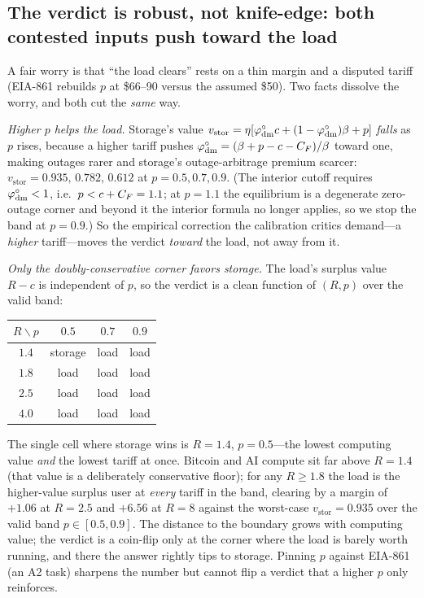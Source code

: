 \subsection*{The verdict is robust, not knife-edge: both contested inputs push toward the load}
A fair worry is that ``the load clears'' rests on a thin margin and a disputed tariff (EIA-861
rebuilds $p$ at \$66--90 versus the assumed \$50). Two facts dissolve the worry, and both cut
the \emph{same} way.

\emph{Higher $p$ helps the load.} Storage's value $v_{\mathrm{stor}}=\eta[\varphi^{\circ}_{\mathrm{dm}}c+(1-\varphi^{\circ}_{\mathrm{dm}})\beta+p]$
\emph{falls} as $p$ rises, because a higher tariff pushes $\varphi^{\circ}_{\mathrm{dm}}=(\beta+p-c-C_F)/\beta$
toward one, making outages rarer and storage's outage-arbitrage premium scarcer:
$v_{\mathrm{stor}}=0.935,\,0.782,\,0.612$ at $p=0.5,0.7,0.9$. (The interior cutoff requires
$\varphi^{\circ}_{\mathrm{dm}}<1$, i.e.\ $p<c+C_F=1.1$; at $p=1.1$ the equilibrium is a degenerate
zero-outage corner and beyond it the interior formula no longer applies, so we stop the band
at $p=0.9$.) So the empirical correction the calibration critics demand---a \emph{higher}
tariff---moves the verdict \emph{toward} the load, not away from it.

\emph{Only the doubly-conservative corner favors storage.} The load's surplus value $R-c$ is
independent of $p$, so the verdict is a clean function of $(R,p)$ over the valid band:
\begin{center}\small
\begin{tabular}{c|ccc}
\toprule
$R\backslash p$ & $0.5$ & $0.7$ & $0.9$\\
\midrule
$1.4$ & storage & load & load\\
$1.8$ & load & load & load\\
$2.5$ & load & load & load\\
$4.0$ & load & load & load\\
\bottomrule
\end{tabular}
\end{center}
The single cell where storage wins is $R=1.4,\,p=0.5$---the lowest computing value
\emph{and} the lowest tariff at once. Bitcoin and AI compute sit far above $R=1.4$ (that value
is a deliberately conservative floor); for any $R\ge1.8$ the load is the higher-value surplus
user at \emph{every} tariff in the band, clearing by a margin of $+1.06$ at $R=2.5$ and $+6.56$
at $R=8$ against the worst-case $v_{\mathrm{stor}}=0.935$ over the valid band $p\in[0.5,0.9]$. The distance to the
boundary grows with computing value; the verdict is a coin-flip only at the corner where the
load is barely worth running, and there the answer rightly tips to storage. Pinning $p$
against EIA-861 (an A2 task) sharpens the number but cannot flip a verdict that a higher $p$
only reinforces.

